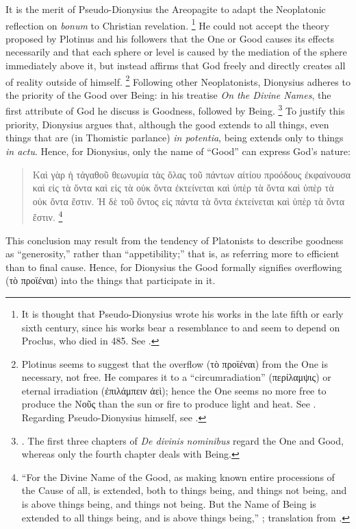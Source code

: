 It is the merit of Pseudo-Dionysius the Areopagite to adapt the Neoplatonic reflection on \emph{bonum} to Christian revelation.%
%
\footnote{It is thought that Pseudo-Dionysius wrote his works in the late fifth or early sixth century, since his works bear a resemblance to and seem to depend on Proclus, who died in 485. See \cite[§~1]{stanford:pseudo-dionysius}.}
%
He could not accept the theory proposed by Plotinus and his followers that the One or Good causes its effects necessarily and that each sphere or level is caused by the mediation of the sphere immediately above it, but instead affirms that God freely and directly creates all of reality outside of himself.
%
\footnote{Plotinus seems to suggest that the overflow (τὸ προϊέναι) from the One is necessary, not free. He compares it to a “circumradiation” (περίλαμψις) or eternal irradiation (ἐπιλάμπειν ἀεὶ); hence the One seems no more free to produce the Νοῦς than the sun or fire to produce light and heat. See \cite[V,~1,~6, and V,~3,~12]{plotinus:enneads}. Regarding Pseudo-Dionysius himself, see \cite[§~4.1]{stanford:pseudo-dionysius}.}
%
Following other Neoplatonists, Dionysius adheres to the priority of the Good over Being: in his treatise \emph{On the Divine Names}, the first attribute of God he discuss is Goodness, followed by Being.%
%
\footnote{\cite[See][65–66]{orourke:pseudo-dionysius}. The first three chapters of \emph{De divinis nominibus} regard the One and Good, whereas only the fourth chapter deals with Being.}
%
To justify this priority, Dionysius argues that, although the good extends to all things, even things that are (in Thomistic parlance) \emph{in potentia}, being extends only to things \emph{in actu}. Hence, for Dionysius, only the name of \enquote{Good} can express God’s nature:
%
\begin{quotation}
Καὶ γὰρ ἡ τἀγαθοῦ θεωνυμία τὰς ὅλας τοῦ πάντων αἰτίου προόδους ἐκφαίνουσα καὶ εἰς τὰ ὄντα καὶ εἰς τὰ οὐκ ὄντα ἐκτείνεται καὶ ὑπὲρ τὰ ὄντα καὶ ὑπὲρ τὰ οὐκ ὄντα ἔστιν. Ἡ δὲ τοῦ ὄντος εἰς πάντα τὰ ὄντα ἐκτείνεται καὶ ὑπὲρ τὰ ὄντα ἔστιν.%
%
\footnote{\enquote{For the Divine Name of the Good, as making known entire processions of the Cause of all, is extended, both to things being, and things not being, and is above things being, and things not being. But the Name of Being is extended to all things being, and is above things being,} \cite[V, 1]{pg:dionysius:DN}; translation from \cite[73]{pg:dionysius:DN:en}.}
%
\end{quotation}
%
This conclusion may result from the tendency of Platonists to describe goodness as \enquote{generosity,} rather than \enquote{appetibility;} that is, as referring more to efficient than to final cause. Hence, for Dionysius the Good formally signifies overflowing (τὸ προϊέναι) into the things that participate in it.%
